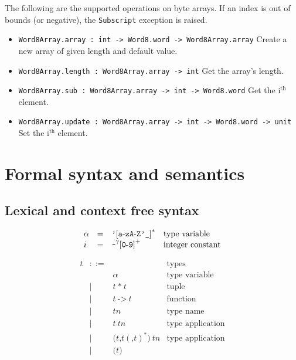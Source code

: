 \documentclass[12pt,a4paper]{book}
\newcommand{\gramsep}{|}
\begin{document}
The following are the supported operations on byte arrays. If an index is out of bounds (or negative), the \texttt{Subscript} exception is raised.
\begin{itemize}
\item \texttt{Word8Array.array : int -> Word8.word -> Word8Array.array} Create a new array of given length and default value.
\item \texttt{Word8Array.length : Word8Array.array -> int} Get the array's length.
\item \texttt{Word8Array.sub : Word8Array.array -> int -> Word8.word} Get the i$^\textrm{th}$ element.
\item \texttt{Word8Array.update : Word8Array.array -> int -> Word8.word -> unit} Set the i$^\textrm{th}$ element.
\end{itemize}



\chapter{Formal syntax and semantics}

\section{Lexical and context free syntax}

\[
\begin{array}{lcll}
\alpha&=& \mbox{\texttt{'}[\texttt{a}-\texttt{z}\texttt{A}-\texttt{Z}\texttt{'}\texttt{\_}]}^*&\mbox{type variable}\\
i &=& \verb|~|^?\mbox{[\texttt{0}-\texttt{9}]}^+&\mbox{integer constant}\\
\end{array}
\]



\[
\begin{array}{lcll}
t & ::= & &\mbox{types}\\
&&\alpha & \mbox{type variable}\\
& \gramsep& t\ \texttt{*}\ t & \mbox{tuple}\\
 &\gramsep &t\ \texttt{->}\ t&\mbox{function}\\
 &\gramsep& \mathit{tn}&\mbox{type name}\\
 &\gramsep&t\ \mathit{tn}&\mbox{type application}\\
 &\gramsep& \texttt{(}t\texttt{,}t(\texttt{,}t)^*\texttt{)}\ \mathit{tn}&\mbox{type application}\\
 &\gramsep&\texttt{(}t\texttt{)}
 \end{array}
 \]
\end{document}
